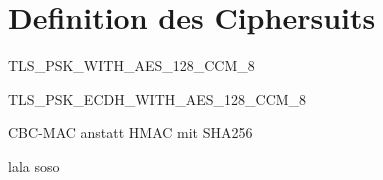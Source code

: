 \chapter{Definition des Ciphersuits}

TLS\_PSK\_WITH\_AES\_128\_CCM\_8

TLS\_PSK\_ECDH\_WITH\_AES\_128\_CCM\_8

CBC-MAC anstatt HMAC mit SHA256

lala  soso